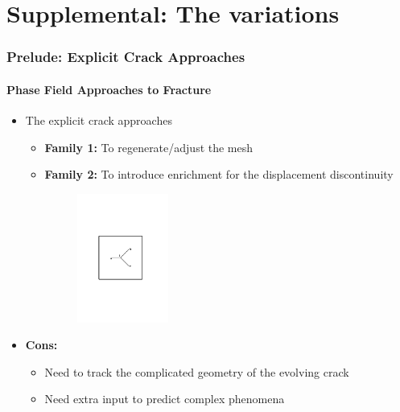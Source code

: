 \documentclass{beamer}
\newcommand{\SectionZero}{Phase Field Approaches to Fracture}
\let\cite\shortcite
\begin{document}
\section{Supplemental: The variations}
\begin{frame}[label=subexp]
	\frametitle{Prelude: Explicit Crack Approaches}
	\framesubtitle{\SectionZero}
	\begin{itemize}
		\setlength\itemsep{2em}
		\item The explicit crack approaches
		\begin{itemize}
			\item \textbf{Family 1:} To regenerate/adjust the mesh
			\item \textbf{Family 2:} To introduce enrichment for the displacement discontinuity
			\begin{figure}
				\includegraphics[width=0.3\textwidth]{FigtwoRight.pdf}
			\end{figure}
		\end{itemize}
		\item \textbf{Cons:}
		\begin{itemize}
			\item Need to track the complicated geometry of the evolving crack
			\item Need extra input to predict complex phenomena
		\end{itemize}
	\end{itemize}
	\hyperlink{phasefield}{}
\end{frame}
\end{document}
